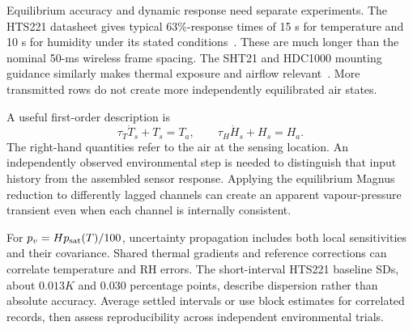 Equilibrium accuracy and dynamic response need separate experiments. The HTS221 datasheet gives typical 63\%-response times of 15 s for temperature and 10 s for humidity under its stated conditions~\cite{hts221}. These are much longer than the nominal 50-ms wireless frame spacing. The SHT21 and HDC1000 mounting guidance similarly makes thermal exposure and airflow relevant~\cite{sht21,hdc1000}. More transmitted rows do not create more independently equilibrated air states.

A useful first-order description is
\begin{equation}
 \tau_T\dot T_s+T_s=T_a,\qquad
 \tau_H\dot H_s+H_s=H_a.
 \label{eq:temperature-humidity-dynamics}
\end{equation}
The right-hand quantities refer to the air at the sensing location. An independently observed environmental step is needed to distinguish that input history from the assembled sensor response. Applying the equilibrium Magnus reduction to differently lagged channels can create an apparent vapour-pressure transient even when each channel is internally consistent.

For $p_v=Hp_{\rm sat}(T)/100$, uncertainty propagation includes both local sensitivities and their covariance. Shared thermal gradients and reference corrections can correlate temperature and RH errors. The short-interval HTS221 baseline SDs, about $0.013\unit{K}$ and 0.030 percentage points, describe dispersion rather than absolute accuracy. Average settled intervals or use block estimates for correlated records, then assess reproducibility across independent environmental trials.
